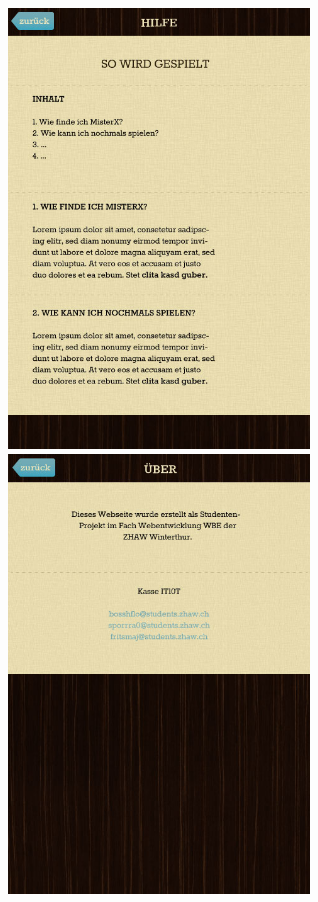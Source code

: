 \documentclass[11pt]{article}
\begin{document}
\includegraphics[width=8cm]{Bilder/hilfeView.jpg}
\includegraphics[width=8cm]{Bilder/ueberView.jpg}
\end{document}
